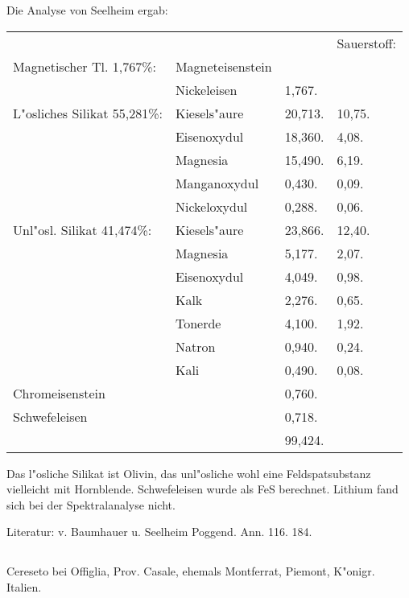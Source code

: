 \documentclass[a4paper, 11pt, oneside]{article}
\begin{document}
Die Analyse von Seelheim ergab:
\begin{table}[!ht]
    \centering\swabfamily\Large
    \begin{tabular}{l l l l}
        & & & Sauerstoff: \\
        Magnetischer Tl. 1,767\%: & Magneteisenstein & &   \\
         & Nickeleisen & 1,767. & \\ \hline
        L"osliches Silikat 55,281\%: & Kiesels"aure & 20,713. & 10,75. \\
         & Eisenoxydul & 18,360. & 4,08. \\
         & Magnesia & 15,490. & 6,19.  \\
         & Manganoxydul & 0,430. & 0,09. \\
         & Nickeloxydul & 0,288. & 0,06. \\ \hline
        Unl"osl. Silikat 41,474\%: & Kiesels"aure & 23,866. & 12,40. \\
         & Magnesia & 5,177. & 2,07. \\
         & Eisenoxydul & 4,049. & 0,98. \\
         & Kalk & 2,276. & 0,65. \\
         & Tonerde & 4,100. & 1,92. \\
         & Natron & 0,940. & 0,24. \\
         & Kali & 0,490. & 0,08. \\ \hline
        Chromeisenstein & & 0,760. & \\
        Schwefeleisen & & 0,718. & \\ \hline
         & & 99,424. & \\
    \end{tabular}
\end{table}

Das l"osliche Silikat ist Olivin, das unl"osliche wohl eine Feldspatsubstanz vielleicht mit Hornblende. Schwefeleisen wurde als FeS berechnet. Lithium fand sich bei der Spektralanalyse nicht.

\normalsize
Literatur: v. Baumhauer u. Seelheim Poggend. Ann. 116. 184.

\subsection{}
\LARGE
\paragraph{}
Cereseto bei Offiglia, Prov. Casale, ehemals Montferrat, Piemont, K"onigr. Italien.
\end{document}
